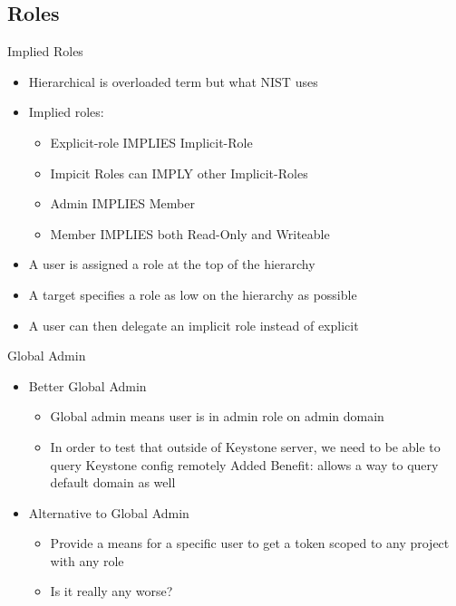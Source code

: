 \documentclass{beamer}
\begin{document}
\subsection {Roles}


\begin{frame}{Implied Roles}
  \begin{itemize}
  \item Hierarchical is overloaded term but what NIST uses
  \item Implied roles:
    \begin{itemize}
    \item Explicit-role IMPLIES Implicit-Role
    \item Impicit Roles can IMPLY other Implicit-Roles
    \item Admin IMPLIES Member
    \item Member IMPLIES both Read-Only and Writeable
    \end{itemize}
  \item A user is assigned a role at the top of the hierarchy
  \item A target specifies a role as low on the hierarchy as possible
  \item A user can then delegate an implicit role instead of explicit
  \end{itemize}
\end{frame}


\begin{frame}{Global Admin}
  \begin{itemize}
  \item   Better Global Admin
    \begin{itemize}
    \item Global admin means user is in admin role on admin domain
    \item In order to test that outside of Keystone server, we need to be able to query Keystone config remotely
      Added Benefit: allows a way to query default domain as well
    \end{itemize}
  \item Alternative to Global Admin
    \begin{itemize}
    \item Provide a means for a specific user to get a token scoped to any project with any role
    \item Is it really any worse?
    \end{itemize}
  \end{itemize}
\end{frame}
\end{document}
